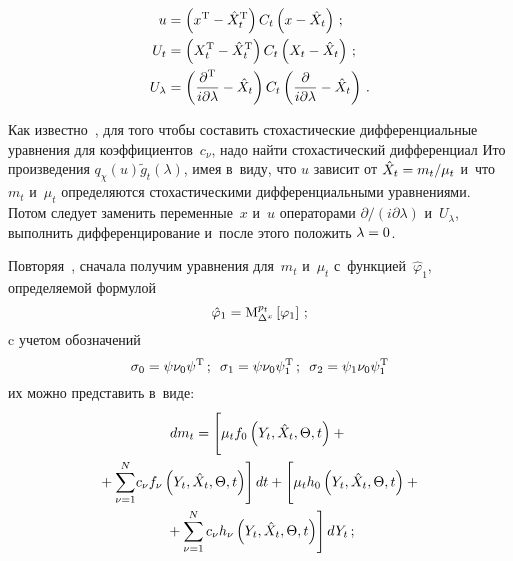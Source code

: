 \begin{multicols}{2}
\pagebreak

\noindent
    \begin{align*}
    u &= \left(x^{\mathrm{T}} -\hat X_t^{\mathrm{T}}\right) 
    C_t\left( x-\hat X_t\right)\,;\\
    U_t  &= \left(X_t^{\mathrm{T}} -\hat X_t^{\mathrm{T}}\right)
    C_t\left(X_t-\hat X_t\right)\,;\\
    U_\lambda &= \left(\displaystyle\frac{\displaystyle \partial^{\mathrm{T}}\mathstrut}{\displaystyle i\partial\lambda\mathstrut} -\hat X_t\right)
    C_t\left(\displaystyle\frac{\displaystyle \partial\mathstrut}{\displaystyle i\partial \lambda\mathstrut} - \hat X_t\right)\,.
    \end{align*}


Как известно~\cite{3-s, 5-s}, для того чтобы составить стохастические 
дифференциальные уравнения
для коэффициентов~$c_\nu$, надо найти
стохастический дифференциал Ито произведения $q_\chi (u) \tilde
g_t (\lambda)$, имея в~виду, что $u$ зависит от $\hat X_t\hm = m_t/\mu_t$
и~что~$m_t$ и~$\mu_t$ определяются стохастическими
дифференциальными уравнениями. Потом следует заменить переменные~$x$ 
и~$u$ операторами $\partial/(i\partial\lambda)$ и~$U_\lambda$,
выполнить дифференцирование и~после этого положить $\lambda\hm=0$.

Повторяя~\cite{5-s}, сначала получим уравнения для~$m_t$ и~$\mu_t$ 
с~функцией~$\hat \varphi_1$, определяемой формулой
\begin{equation*}
\hat \varphi_1 ={\rm M}_{\Delta^x}^{p_t} \left[ \varphi_1\right]\,;
\end{equation*}
c учетом обозначений
  \begin{equation*}
    \sigma_0 = \psi\nu_0 \psi^{\mathrm{T}}\,; \enskip
    \sigma_1 = \psi\nu_0 \psi_1^{\mathrm{T}}\,; \enskip 
    \sigma_2 = \psi_1\nu_0 \psi_1^{\mathrm{T}}
    \end{equation*}
их можно представить в~виде:
\begin{multline}
    dm_t = \left[
    \vphantom{    \sss_{\nu=1}^N}
    \mu_t f_0 \left(Y_t,\hat X_t,\Theta, t\right) +{}\right.\\
\left.    {}+
    \sss_{\nu=1}^N \hspace*{-1.4261pt}c_\nu f_\nu \left(Y_t,\hat     X_t,\Theta, t\right)\right] dt+
\left[ \vphantom{    \sss_{\nu=1}^N}
    \mu_t h_0 \left(Y_t,\hat X_t,\Theta, t\right) +{}\right.\\
\left.    {}+\sss_{\nu=1}^N c_\nu
    h_\nu \left(Y_t,\hat X_t,\Theta, t\right) 
          \right] dY_t\,;
    \label{e3.6-s}
    \end{multline}
    

\end{multicols}
